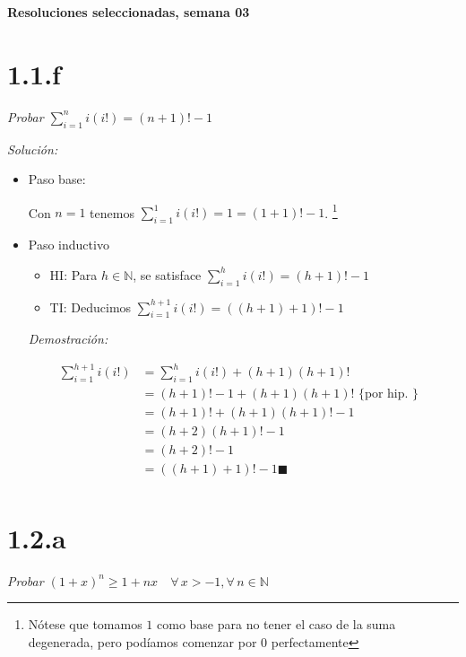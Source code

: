 \documentclass[10pt,a4paper]{article}
\newcommand{\qed}{\blacksquare}
\begin{document}
\vspace{0,3cm}

\begin{center}
{\bf \Large Resoluciones seleccionadas, semana 03}
\end{center}


\vspace{0,3cm}

\section*{1.1.f}\emph{Probar $\sum_{i=1}^n i(i!)= (n + 1)! - 1$}

\noindent
\emph{Solución:}

\begin{itemize}
\item Paso base:
  
  Con $n=1$ tenemos $\sum_{i=1}^1 i(i!)=1=(1+1)! -1$.
  \footnote{Nótese que tomamos $1$ como base para no tener el caso
    de la suma degenerada, pero podíamos comenzar por $0$ perfectamente}

\item Paso inductivo

  \begin{itemize}
  \item HI: Para $h\in \mathbb{N}$, se satisface
    $\sum_{i=1}^h i(i!)= (h + 1)! - 1$
  \item TI: Deducimos $\sum_{i=1}^{h+1} i(i!)= ((h + 1) + 1)! - 1$
  \end{itemize}
\emph{Demostración:}

\begin{align*}
  \sum_{i=1}^{h+1} i(i!)
  &= \sum_{i=1}^{h} i(i!) + (h+1)(h+1)! &\\
  &= (h+1)! - 1 + (h+1)(h+1)! {\text{ \{ por hip. \} } } &\\
  &= (h+1)! + (h+1)(h+1)! - 1 &\\
  &= (h+2)(h+1)! - 1 &\\
  &= (h+2)! - 1 &\\
  &= ((h + 1) + 1)! - 1  \qed &\\
\end{align*}
  
\end{itemize}





\section*{1.2.a}
\emph{Probar $(1+x)^n \geq 1+nx \quad \forall \, x>-1,
  \forall \, n \in \mathbb{N}$ }
\end{document}
